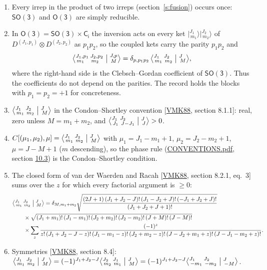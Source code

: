 \documentclass[10pt,a4paper]{article}
\numberwithin{equation}{section}
\newcommand{\grp}[1]{\mathsf{#1}}
\newcommand{\dirprod}{\times}
\newcommand{\irrJp}[2]{D^{(#1,#2)}}
\newcommand{\irrprod}{\otimes}
\newcommand{\intx}{\mu}
\newcommand{\jm}[2]{\bigl\lvert{}^{#1}_{\,#2}\bigr\rangle}
\newcommand{\cgc}[6]{\bigl\langle{}^{#1}_{\,#2}\,{}^{#3}_{\,#4}\bigm\vert{}^{#5}_{\,#6}\bigr\rangle}
\newcommand{\cgcp}[9]{\bigl\langle{}^{#1,#3}_{\,#2}\,{}^{#4,#6}_{\,#5}\bigm\vert{}^{#7,#9}_{\,#8}\bigr\rangle}
\newenvironment{romanlist}{\begin{enumerate}%
\renewcommand{\labelenumi}{(\roman{enumi})}}%
  {\end{enumerate}}
\begin{document}
\begin{romanlist}\raggedright
\item Every irrep in the product of two irreps (section~\ref{s:fusion}) occurs once: \href{SO3.pdf}{$\grp{SO(3)}$} and \href{O3.pdf}{$\grp{O(3)}$} are simply reducible.
\item In $\grp{O(3)} = \grp{SO(3)}\dirprod\grp{C_{i}}$ the inversion acts on every ket $\jm{J_1}{m_1}\jm{J_2}{m_2}$ of $\irrJp{J_1}{p_1}\irrprod \irrJp{J_2}{p_2}$ as $p_1p_2$, so the coupled kets carry the parity $p_1p_2$ and \begin{equation}\label{e:o3cg}\cgcp{J_1}{m_1}{p_1}{J_2}{m_2}{p_2}{J}{M}{p} = \delta_{p,p_1p_2}\,\cgc{J_1}{m_1}{J_2}{m_2}{J}{M},\end{equation}where the right-hand side is the Clebsch--Gordan coefficient of \href{SO3.pdf}{$\grp{SO(3)}$}. Thus the coefficients do not depend on the parities. The record holds the blocks with $p_1 = p_2 = +1$ for concreteness.
\item $\cgc{J_1}{m_1}{J_2}{m_2}{J}{M}$ in the Condon--Shortley convention [\href{../../../REFERENCES.pdf\#ref.VMK88}{VMK88}, section 8.1.1]: real, zero unless $M = m_1 + m_2$, and $\cgc{J_1}{J_1}{J_2}{J-J_1}{J}{J} > 0$.
\item $C[(\intx_1,\intx_2),\intx] = \cgc{J_1}{m_1}{J_2}{m_2}{J}{M}$ with $\intx_1 = J_1 - m_1 + 1$, $\intx_2 = J_2 - m_2 + 1$, $\intx = J - M + 1$ ($m$ descending), so the phase rule (\href{../../CONVENTIONS.pdf}{CONVENTIONS.pdf}, section \href{../../CONVENTIONS.pdf\#conv.10.3}{10.3}) is the Condon--Shortley condition.
\item The closed form of van der Waerden and Racah [\href{../../../REFERENCES.pdf\#ref.VMK88}{VMK88}, section 8.2.1, eq.~3] sums over the $z$ for which every factorial argument is $\ge 0$: \begin{equation}\begin{aligned}&\cgc{J_1}{m_1}{J_2}{m_2}{J}{M} = \delta_{M,m_1+m_2}\sqrt{\frac{(2J+1)\,(J_1+J_2-J)!\,(J_1-J_2+J)!\,(-J_1+J_2+J)!}{(J_1+J_2+J+1)!}}\\ &\qquad\times\sqrt{(J_1+m_1)!\,(J_1-m_1)!\,(J_2+m_2)!\,(J_2-m_2)!\,(J+M)!\,(J-M)!}\\ &\qquad\times\sum_z\frac{(-1)^z}{z!\,(J_1+J_2-J-z)!\,(J_1-m_1-z)!\,(J_2+m_2-z)!\,(J-J_2+m_1+z)!\,(J-J_1-m_2+z)!}.\end{aligned}\end{equation}
\item Symmetries [\href{../../../REFERENCES.pdf\#ref.VMK88}{VMK88}, section 8.4]: $\cgc{J_1}{m_1}{J_2}{m_2}{J}{M} = (-1)^{J_1+J_2-J}\cgc{J_2}{m_2}{J_1}{m_1}{J}{M} = (-1)^{J_1+J_2-J}\cgc{J_1}{{-m_1}}{J_2}{{-m_2}}{J}{{-M}}$.
\end{romanlist}
\end{document}
